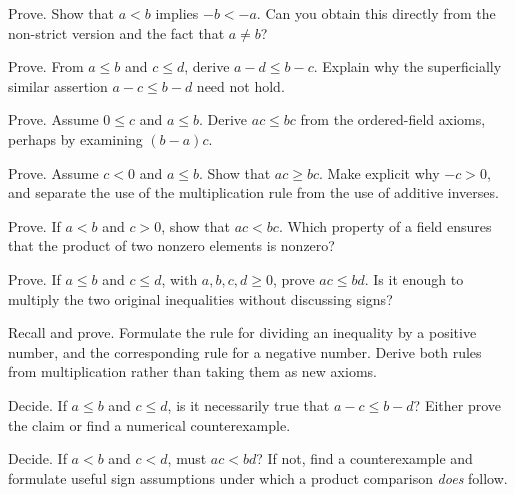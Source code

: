 \documentclass{workbook}
\begin{document}
\begin{problem}{Prove.}
Show that $a<b$ implies $-b<-a$. Can you obtain this directly from the
non-strict version and the fact that $a\neq b$?
\end{problem}

\begin{problem}{Prove.}
From $a\leq b$ and $c\leq d$, derive $a-d\leq b-c$.
Explain why the superficially similar assertion $a-c\leq b-d$ need not hold.
\end{problem}

\begin{problem}{Prove.}
Assume $0\leq c$ and $a\leq b$. Derive $ac\leq bc$ from the ordered-field
axioms, perhaps by examining $(b-a)c$.
\end{problem}

\begin{problem}{Prove.}
Assume $c<0$ and $a\leq b$. Show that $ac\geq bc$.
Make explicit why $-c>0$, and separate the use of the multiplication rule
from the use of additive inverses.
\end{problem}

\begin{problem}{Prove.}
If $a<b$ and $c>0$, show that $ac<bc$. Which property of a field ensures
that the product of two nonzero elements is nonzero?
\end{problem}

\begin{problem}{Prove.}
If $a\leq b$ and $c\leq d$, with $a,b,c,d\geq0$, prove $ac\leq bd$.
Is it enough to multiply the two original inequalities without discussing
signs?
\end{problem}

\begin{problem}{Recall and prove.}
Formulate the rule for dividing an inequality by a positive number, and
the corresponding rule for a negative number. Derive both rules from
multiplication rather than taking them as new axioms.
\end{problem}

\begin{problem}{Decide.}
If $a\leq b$ and $c\leq d$, is it necessarily true that $a-c\leq b-d$?
Either prove the claim or find a numerical counterexample.
\end{problem}

\begin{problem}{Decide.}
If $a<b$ and $c<d$, must $ac<bd$? If not, find a counterexample and
formulate useful sign assumptions under which a product comparison
\emph{does} follow.
\end{problem}
\end{document}
